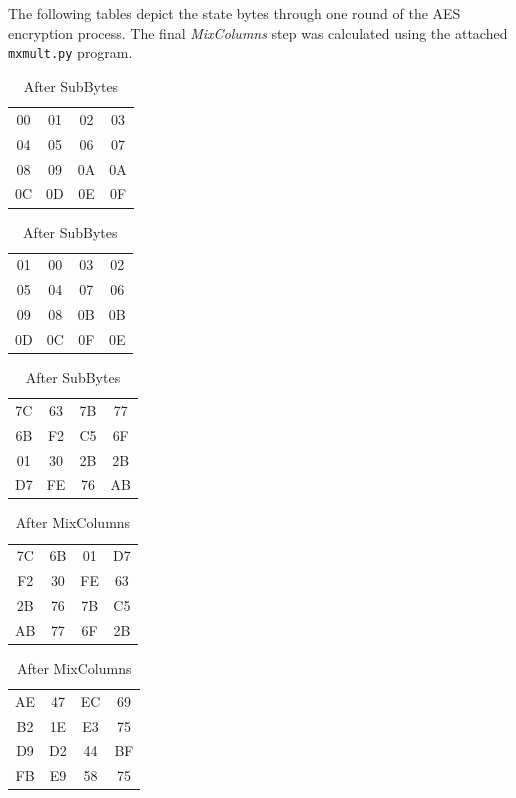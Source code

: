 \documentclass[letterpaper]{article}
\begin{document}
\section{}
The following tables depict the state bytes through one  round of the AES encryption process. The final \textit{MixColumns} step was calculated using the attached \texttt{mxmult.py} program.
\begin{table}[h!]
    \centering
    \parbox{5cm}{
        \centering
        \begin{tabular}{cccc}
            00 & 01 & 02 & 03 \\
            04 & 05 & 06 & 07 \\
            08 & 09 & 0A & 0A \\
            0C & 0D & 0E & 0F \\
        \end{tabular}
        \caption{Original Contents}
        \label{tab:mes1}
    }
    \parbox{5cm}{
        \centering
        \begin{tabular}{cccc}
            01 & 00 & 03 & 02 \\
            05 & 04 & 07 & 06 \\
            09 & 08 & 0B & 0B \\
            0D & 0C & 0F & 0E \\
        \end{tabular}
        \caption{After AddRoundKey}
        \label{tab:mes2}
    }
    \parbox{5cm}{
        \centering
        \begin{tabular}{cccc}
            7C & 63 & 7B & 77 \\
            6B & F2 & C5 & 6F \\
            01 & 30 & 2B & 2B \\
            D7 & FE & 76 & AB \\
        \end{tabular}
        \caption{After SubBytes}
        \label{tab:mes3}
    }
\end{table}


\begin{table}[h!]
    \centering
    \parbox{5cm}{
        \begin{tabular}{cccc}
            7C & 6B & 01 & D7 \\
            F2 & 30 & FE & 63 \\
            2B & 76 & 7B & C5 \\
            AB & 77 & 6F & 2B \\
        \end{tabular}
        \caption{After ShiftRows}
        \label{tab:mes4}
    }
    \parbox{5cm}{
        \centering
        \begin{tabular}{cccc}
            AE & 47 & EC & 69 \\
            B2 & 1E & E3 & 75 \\
            D9 & D2 & 44 & BF \\
            FB & E9 & 58 & 75 \\
        \end{tabular}
        \caption{After MixColumns}
        \label{tab:mes5}
    }
\end{table}
\end{document}
